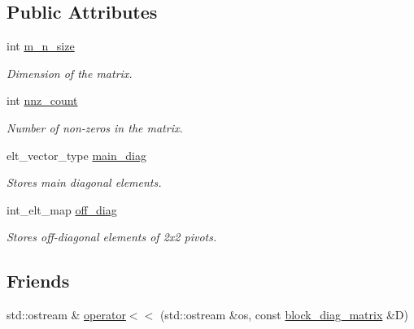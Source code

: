 \subsection*{Public Attributes}
\begin{DoxyCompactItemize}
\item 
int \hyperlink{classblock__diag__matrix_a8e55b8cb27c7686a6e62f5e1655723b4}{m\+\_\+n\+\_\+size}\hypertarget{classblock__diag__matrix_a8e55b8cb27c7686a6e62f5e1655723b4}{}\label{classblock__diag__matrix_a8e55b8cb27c7686a6e62f5e1655723b4}

\begin{DoxyCompactList}\small\item\em Dimension of the matrix. \end{DoxyCompactList}\item 
int \hyperlink{classblock__diag__matrix_a13fa6893c7125ff3443e75d3b5f64cd9}{nnz\+\_\+count}\hypertarget{classblock__diag__matrix_a13fa6893c7125ff3443e75d3b5f64cd9}{}\label{classblock__diag__matrix_a13fa6893c7125ff3443e75d3b5f64cd9}

\begin{DoxyCompactList}\small\item\em Number of non-\/zeros in the matrix. \end{DoxyCompactList}\item 
elt\+\_\+vector\+\_\+type \hyperlink{classblock__diag__matrix_a74396564eee4ad30c97b0eab031dda32}{main\+\_\+diag}\hypertarget{classblock__diag__matrix_a74396564eee4ad30c97b0eab031dda32}{}\label{classblock__diag__matrix_a74396564eee4ad30c97b0eab031dda32}

\begin{DoxyCompactList}\small\item\em Stores main diagonal elements. \end{DoxyCompactList}\item 
int\+\_\+elt\+\_\+map \hyperlink{classblock__diag__matrix_a894255ea4928f43a2cae577abc4910d3}{off\+\_\+diag}\hypertarget{classblock__diag__matrix_a894255ea4928f43a2cae577abc4910d3}{}\label{classblock__diag__matrix_a894255ea4928f43a2cae577abc4910d3}

\begin{DoxyCompactList}\small\item\em Stores off-\/diagonal elements of 2x2 pivots. \end{DoxyCompactList}\end{DoxyCompactItemize}
\subsection*{Friends}
\begin{DoxyCompactItemize}
\item 
std\+::ostream \& \hyperlink{classblock__diag__matrix_a17f3419f2a6f824dea494d9ac229c000}{operator$<$$<$} (std\+::ostream \&os, const \hyperlink{classblock__diag__matrix}{block\+\_\+diag\+\_\+matrix} \&D)
\end{DoxyCompactItemize}


